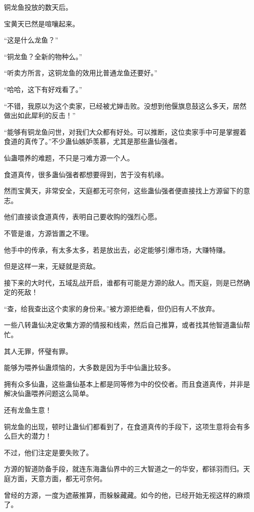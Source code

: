 
\begin{this_body}

铜龙鱼投放的数天后。

宝黄天已然是喧嚷起来。

“这是什么龙鱼？”

“铜龙鱼？全新的物种么。”

“听卖方所言，这铜龙鱼的效用比普通龙鱼还要好。”

“哈哈，这下有好戏看了。”

“不错，我原以为这个卖家，已经被尤婵击败。没想到他偃旗息鼓这么多天，居然做出如此犀利的反击！”

“能够有铜龙鱼问世，对我们大众都有好处。可以推断，这位卖家手中可是掌握着食道的真传了。”不少蛊仙嫉妒羡慕，尤其是那些蛊仙强者。

仙蛊喂养的难题，不只是刁难方源一个人。

食道真传，很多蛊仙强者都想要得到，苦于没有机缘。

然而宝黄天，非常安全，天庭都无可奈何，这些蛊仙强者便直接找上方源留下的意志。

他们直接谈食道真传，表明自己要收购的强烈心愿。

不管是谁，方源皆置之不理。

他手中的传承，有太多太多，若是放出去，必定能够引爆市场，大赚特赚。

但是这样一来，无疑就是资敌。

接下来的大时代，五域乱战开启，谁都有可能是方源的敌人。而天庭，则是已然确定的死敌！

“查，给我查出这个卖家的身份来。”被方源拒绝看，但仍旧有人不放弃。

一些八转蛊仙决定收集方源的情报和线索，然后自己推算，或者找其他智道蛊仙帮忙。

其人无罪，怀璧有罪。

能够为喂养仙蛊烦恼的，大多数是因为手中仙蛊比较多。

拥有众多仙蛊，这些蛊仙基本上都是同等修为中的佼佼者。而且食道真传，并非是解决仙蛊喂养问题这么简单。

还有龙鱼生意！

铜龙鱼的出现，顿时让蛊仙们都看到了，在食道真传的手段下，这项生意将会有多么巨大的潜力！

不过，他们注定是要失败了。

方源的智道防备手段，就连东海蛊仙界中的三大智道之一的华安，都铩羽而归。天庭方面，天意方面，都无可奈何。

曾经的方源，一度为遮蔽推算，而躲躲藏藏。如今的他，已经开始无视这样的麻烦了。


\end{this_body}
